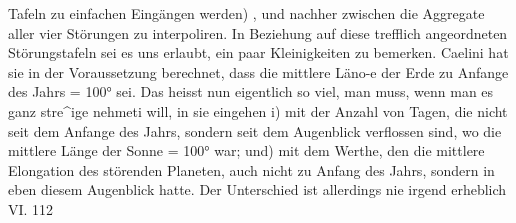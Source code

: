 \documentclass[12pt,a4paper]{article}
\begin{document}
Tafeln zu einfachen Eingängen werden) , und nachher zwischen die Aggregate aller vier Störungen zu\newline
interpoliren. In Beziehung auf diese trefflich angeordneten Störungstafeln sei es uns erlaubt, ein paar\newline
Kleinigkeiten zu bemerken. Caelini hat sie in der Voraussetzung berechnet, dass die mittlere Läno-e\newline
der Erde zu Anfange des Jahrs = 100° sei. Das heisst nun eigentlich so viel, man muss, wenn man es\newline
ganz stre\^{}ige nehmeti will, in sie eingehen i) mit der Anzahl von Tagen, die nicht seit dem Anfange des\newline
Jahrs, sondern seit dem Augenblick verflossen sind, wo die mittlere Länge der Sonne = 100° war; und) mit dem Werthe, den die mittlere Elongation des störenden Planeten, auch nicht zu Anfang des\newline
Jahrs, sondern in eben diesem Augenblick hatte. Der Unterschied ist allerdings nie irgend erheblich\newline
VI. 112\newline
\end{document}
